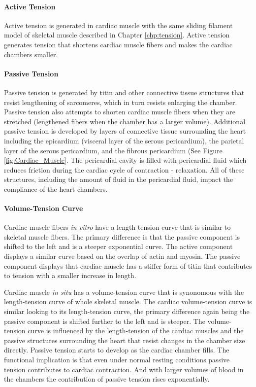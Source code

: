 \paragraph{Active Tension}

Active tension is generated in cardiac muscle with the same sliding filament model of skeletal muscle described in Chapter \ref{chp:tension}. Active tension generates tension that shortens cardiac muscle fibers and makes the cardiac chambers smaller. 

\paragraph{Passive Tension}

Passive tension is generated by titin and other connective tissue structures that resist lengthening of sarcomeres, which in turn resists enlarging the chamber. Passive tension also attempts to shorten cardiac muscle fibers when they are stretched (lengthened fibers when the chamber has a larger volume). Additional passive tension is developed by layers of connective tissue surrounding the heart including the epicardium (visceral layer of the serous pericardium), the parietal layer of the serous pericardium, and the fibrous pericardium (See Figure \ref{fig:Cardiac_Muscle}. The pericardial cavity is filled with pericardial fluid which reduces friction during the cardiac cycle of contraction - relaxation. All of these structures, including the amount of fluid in the pericardial fluid, impact the compliance of the heart chambers.

\paragraph{Volume-Tension Curve}

Cardiac muscle fibers \textit{in vitro} have a length-tension curve that is similar to skeletal muscle fibers. The primary difference is that the passive component is shifted to the left and is a steeper exponential curve. The active component displays a similar curve based on the overlap of actin and myosin. The passive component displays that cardiac muscle has a stiffer form of titin that contributes to tension with a smaller increase in length. 

Cardiac muscle \textit{in situ} has a volume-tension curve that is synonomous with the length-tension curve of whole skeletal muscle. The cardiac volume-tension curve is similar looking to its length-tension curve, the primary difference again being the passive component is shifted further to the left and is steeper. The volume-tension curve is influenced by the length-tension of the cardiac muscles and the passive structures surrounding the heart that resist changes in the chamber size directly. Passive tension starts to develop as the cardiac chamber fills. The functional implication is that even under normal resting conditions passive tension contributes to cardiac contraction. And with larger volumes of blood in the chambers the contribution of passive tension rises exponentially.

